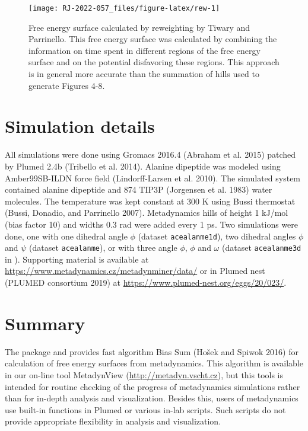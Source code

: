 \begin{figure}

{\centering \texttt{[image: RJ-2022-057\_files/figure-latex/rew-1]} 

}

\caption{Free energy surface calculated by reweighting by Tiwary and Parrinello. This free energy surface was calculated by combining the information on time spent in different regions of the free energy surface and on the potential disfavoring these regions. This approach is in general more accurate than the summation of hills used to generate Figures 4-8.}\label{fig:rew}
\end{figure}

\hypertarget{simulation-details}{%
\section{Simulation details}\label{simulation-details}}

All simulations were done using Gromacs 2016.4 (Abraham et al. 2015) patched by
Plumed 2.4b (Tribello et al. 2014). Alanine dipeptide was modeled using
Amber99SB-ILDN force field (Lindorff-Larsen et al. 2010). The simulated system
contained alanine dipeptide and 874 TIP3P (Jorgensen et al. 1983) water
molecules. The temperature was kept constant at 300 K using Bussi
thermostat (Bussi, Donadio, and Parrinello 2007). Metadynamics hills of height
1 kJ/mol (bias factor 10) and widths 0.3 rad were added
every 1 ps. Two simulations were done, one with
one dihedral angle \(\phi\) (dataset \texttt{acealanme1d}),
two dihedral angles \(\phi\) and \(\psi\) (dataset \texttt{acealanme}),
or with three angle \(\phi\), \(\phi\) and \(\omega\) (dataset
\texttt{acealanme3d} in ).
Supporting material is available at
\url{https://www.metadynamics.cz/metadynminer/data/}
or in Plumed nest (PLUMED consortium 2019) at
\url{https://www.plumed-nest.org/eggs/20/023/}.

\hypertarget{summary}{%
\section{Summary}\label{summary}}

The package  and  provides fast algorithm
Bias Sum (Hošek and Spiwok 2016) for calculation of free energy surfaces from
metadynamics. This algorithm is available in our on-line tool
MetadynView (\url{http://metadyn.vscht.cz}), but this tools is
intended for routine checking of the progress of metadynamics
simulations rather than for in-depth analysis and visualization.
Besides this, users of metadynamics use built-in functions in
Plumed or various in-lab scripts. Such scripts do not provide
appropriate flexibility in analysis and visualization.

